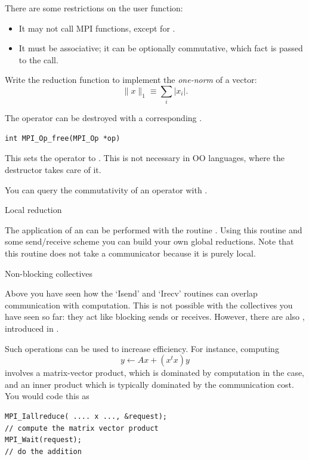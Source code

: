 There are some restrictions on the user function:
\begin{itemize}
\item It may not call MPI functions, except for
  .
\item It must be associative; it can be optionally commutative, which
  fact is passed to the  call.
\end{itemize}

\begin{exercise}
  \label{ex:one-norm-op}
  Write the reduction function to implement the
  \emph{one-norm} of a vector:
  \[ \|x\|_1 \equiv \sum_i |x_i|. \]
\end{exercise}

The operator can be destroyed with a corresponding
.
\begin{lstlisting}
int MPI_Op_free(MPI_Op *op)
\end{lstlisting}
This sets the operator to .
This is not necessary in \ac{OO} languages,
where the destructor takes care of it.

You can query the commutativity of an operator with
%
.

 {Local reduction}

The application of an  can be performed with the routine
. Using this routine and some
send/receive scheme you can build your own global reductions. Note
that this routine does not take a communicator because it is purely local.


 {Non-blocking collectives}
\label{sec:mpi3collect}

Above you have seen how the `Isend' and `Irecv' routines can overlap communication
with computation. This is not possible with the collectives you have seen so far:
they act like blocking sends or receives.
However, there are also ,
introduced in .

Such operations can be used to increase efficiency.
For instance, computing
\[ y \leftarrow Ax + (x^tx)y \]
involves a matrix-vector product, which is dominated by computation
in the  case, and an inner product which is 
typically dominated by the communication cost. You would code this as
\begin{lstlisting}
MPI_Iallreduce( .... x ..., &request);
// compute the matrix vector product
MPI_Wait(request);
// do the addition
\end{lstlisting}

